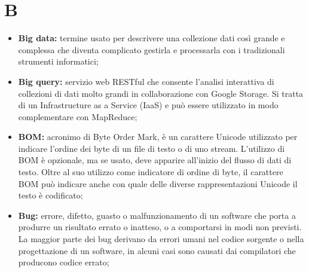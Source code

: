 \section*{\Huge B} %
\label{sec:b}
	\begin{itemize}
		\item \textbf{Big data:} termine usato per descrivere una collezione dati così grande e complessa che diventa complicato gestirla e processarla con i tradizionali strumenti informatici;
		\item \textbf{Big query:} servizio web RESTful che consente l'analisi interattiva di collezioni di dati molto grandi in collaborazione con Google Storage. Si tratta di un Infrastructure as a Service (IaaS) e può essere utilizzato in modo complementare con MapReduce;
		\item \textbf{BOM:} acronimo di Byte Order Mark, è un carattere Unicode utilizzato per indicare l'ordine dei byte di un file di testo o di uno stream. L'utilizzo di BOM è opzionale, ma se usato, deve apparire all'inizio del flusso di dati di testo. Oltre al suo utilizzo come indicatore di ordine di byte, il carattere BOM può indicare anche con quale delle diverse rappresentazioni Unicode il testo è codificato;
		\item \textbf{Bug:} errore, difetto, guasto o malfunzionamento di un software che porta a produrre un risultato errato o inatteso, o a comportarsi in modi non previsti. La maggior parte dei bug derivano da errori umani nel codice sorgente o nella progettazione di un software, in alcuni casi sono causati dai compilatori che producono codice errato;
	\end{itemize}
\pagebreak

